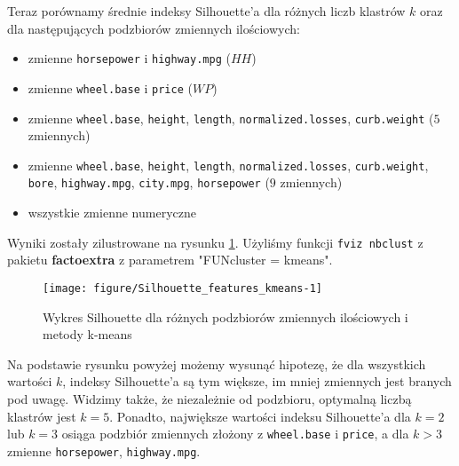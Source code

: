 \documentclass[12pt, a4paper]{article}\usepackage[]{graphicx}\usepackage[]{xcolor}
\makeatletter
\def\maxwidth{ %
  \ifdim\Gin@nat@width>\linewidth
    \linewidth
  \else
    \Gin@nat@width
  \fi
}
\newenvironment{knitrout}{}{} %
\makeatother
\begin{document}
\par
Teraz porównamy średnie indeksy Silhouette'a dla różnych liczb klastrów $k$ oraz dla następujących podzbiorów zmiennych ilościowych:
\begin{itemize}
\item zmienne \texttt{horsepower} i \texttt{highway.mpg} ($HH$)
\item zmienne \texttt{wheel.base} i \texttt{price} ($WP$) 
\item zmienne \texttt{wheel.base}, \texttt{height}, \texttt{length}, \texttt{normalized.losses}, \texttt{curb.weight} ($5$ zmiennych)
\item zmienne \texttt{wheel.base}, \texttt{height}, \texttt{length}, \texttt{normalized.losses}, \texttt{curb.weight}, \texttt{bore}, \texttt{highway.mpg}, \texttt{city.mpg}, \texttt{horsepower} ($9$ zmiennych)
\item wszystkie zmienne numeryczne
\end{itemize}

Wyniki zostały zilustrowane na rysunku \ref{fig:Silhouette_features_kmeans}. Użyliśmy funkcji \texttt{fviz nbclust} \cite{nbclust} z pakietu \textbf{factoextra} z parametrem "FUNcluster = kmeans".
\begin{knitrout}
\color{fgcolor}\begin{figure}[H]

{\centering \texttt{[image: figure/Silhouette\_features\_kmeans-1]} 

}

\caption[Wykres Silhouette dla różnych podzbiorów zmiennych ilościowych i metody k-means]{Wykres Silhouette dla różnych podzbiorów zmiennych ilościowych i metody k-means}\label{fig:Silhouette_features_kmeans}
\end{figure}

\end{knitrout}

Na podstawie rysunku powyżej możemy wysunąć hipotezę, że dla wszystkich wartości $k$, indeksy Silhouette'a są tym większe, im mniej zmiennych jest branych pod uwagę. Widzimy także, że niezależnie od podzbioru, optymalną liczbą klastrów jest $k=5$. Ponadto, największe wartości indeksu Silhouette'a dla $k=2$ lub $k=3$ osiąga podzbiór zmiennych złożony z \texttt{wheel.base} i \texttt{price}, a dla $k>3$ zmienne \texttt{horsepower}, \texttt{highway.mpg}.

\newpage
 
\end{document}
